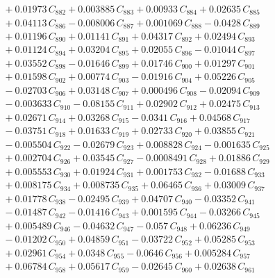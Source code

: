 \documentclass[a4paper,11pt]{article}
\begin{document}
\begin{align}
&\quad + 0.01973\,C_{882} + 0.003885\,C_{883} + 0.00933\,C_{884} + 0.02635\,C_{885} \nonumber\\
&\quad + 0.04113\,C_{886} - 0.008006\,C_{887} + 0.001069\,C_{888} - 0.0428\,C_{889} \nonumber\\
&\quad + 0.01196\,C_{890} + 0.01141\,C_{891} + 0.04317\,C_{892} + 0.02494\,C_{893} \nonumber\\
&\quad + 0.01124\,C_{894} + 0.03204\,C_{895} + 0.02055\,C_{896} - 0.01044\,C_{897} \nonumber\\
&\quad + 0.03552\,C_{898} - 0.01646\,C_{899} + 0.01746\,C_{900} + 0.01297\,C_{901} \nonumber\\
&\quad + 0.01598\,C_{902} + 0.00774\,C_{903} - 0.01916\,C_{904} + 0.05226\,C_{905} \nonumber\\
&\quad - 0.02703\,C_{906} + 0.03148\,C_{907} + 0.000496\,C_{908} - 0.02094\,C_{909} \nonumber\\
&\quad - 0.003633\,C_{910} - 0.08155\,C_{911} + 0.02902\,C_{912} + 0.02475\,C_{913} \nonumber\\
&\quad + 0.02671\,C_{914} + 0.03268\,C_{915} - 0.0341\,C_{916} + 0.04568\,C_{917} \nonumber\\
&\quad - 0.03751\,C_{918} + 0.01633\,C_{919} + 0.02733\,C_{920} + 0.03855\,C_{921} \nonumber\\
&\quad - 0.005504\,C_{922} - 0.02679\,C_{923} + 0.008828\,C_{924} - 0.001635\,C_{925} \nonumber\\
&\quad + 0.002704\,C_{926} + 0.03545\,C_{927} - 0.0008491\,C_{928} + 0.01886\,C_{929} \nonumber\\
&\quad + 0.005553\,C_{930} + 0.01924\,C_{931} + 0.001753\,C_{932} - 0.01688\,C_{933} \nonumber\\
&\quad + 0.008175\,C_{934} + 0.008735\,C_{935} + 0.06465\,C_{936} + 0.03009\,C_{937} \nonumber\\
&\quad + 0.01778\,C_{938} - 0.02495\,C_{939} + 0.04707\,C_{940} - 0.03352\,C_{941} \nonumber\\
&\quad - 0.01487\,C_{942} - 0.01416\,C_{943} + 0.001595\,C_{944} - 0.03266\,C_{945} \nonumber\\
&\quad + 0.005489\,C_{946} - 0.04632\,C_{947} - 0.057\,C_{948} + 0.06236\,C_{949} \nonumber\\
&\quad - 0.01202\,C_{950} + 0.04859\,C_{951} - 0.03722\,C_{952} + 0.05285\,C_{953} \nonumber\\
&\quad + 0.02961\,C_{954} + 0.0348\,C_{955} - 0.0646\,C_{956} + 0.005284\,C_{957} \nonumber\\
&\quad + 0.06784\,C_{958} + 0.05617\,C_{959} - 0.02645\,C_{960} + 0.02638\,C_{961} \nonumber\\

\end{align}
\end{document}
